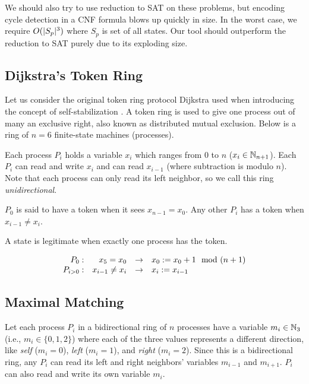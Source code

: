 We should also try to use reduction to SAT on these problems, but encoding cycle detection in a CNF formula blows up quickly in size.
In the worst case, we require $O(\lvert S_p\rvert^3)$ where $S_p$ is set of all states.
Our tool should outperform the reduction to SAT purely due to its exploding size.

\subsection{Dijkstra's Token Ring}
Let us consider the original token ring protocol Dijkstra used when introducing the concept of self-stabilization \cite{dij}.
A token ring is used to give one process out of many an exclusive right, also known as distributed mutual exclusion.
Below is a ring of $n=6$ finite-state machines (processes).


Each process $P_i$ holds a variable $x_i$ which ranges from $0$ to $n$ ($x_i\in\mathbb{N}_{n+1}$).
Each $P_i$ can read and write $x_i$ and can read $x_{i-1}$ (where subtraction is modulo $n$).
Note that each process can only read its left neighbor, so we call this ring {\em unidirectional}.

$P_0$ is said to have a token when it sees $x_{n-1} = x_0$.
Any other $P_i$ has a token when $x_{i-1} \neq x_i$.

A state is legitimate when exactly one process has the token.

\[
\begin{array}{rrcl}
 P_0: & x_{5} = x_0 & \to & x_0 := x_0 + 1 \mod (n+1)
\\ P_{i>0}: & x_{i-1} \neq x_i & \to & x_i := x_{i-1}
\end{array}
\]

\subsection{Maximal Matching}

Let each process $P_i$ in a bidirectional ring of $n$ processes have a variable $m_i\in \mathbb{N}_3$ (i.e., $m_i\in \{0,1,2\}$) where each of the three values represents a different direction, like {\it self} ($m_i=0$), {\it left} ($m_i=1$), and {\it right} ($m_i=2$).
Since this is a bidirectional ring, any $P_i$ can read its left and right neighbors' variables $m_{i-1}$ and $m_{i+1}$.
$P_i$ can also read and write its own variable $m_i$.

